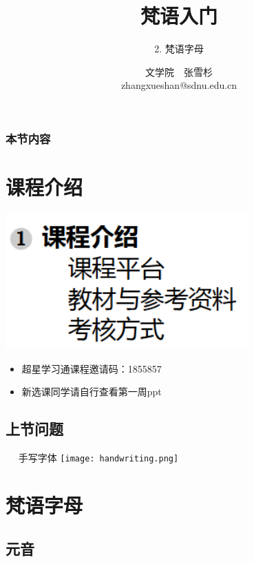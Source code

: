 \documentclass[17pt]{beamer}
\title{{梵语入门}}
\subtitle{2. 梵语字母}
\author[张雪杉]{文学院~~张雪杉 \\ zhangxueshan@sdnu.edu.cn}
\date{}
\begin{document}
	


\begin{frame}
  \titlepage
\end{frame}

\begin{frame}
  \frametitle{本节内容}
  \tableofcontents
\end{frame}

\section{课程介绍}
\begin{frame}{\insertsection }  
  \includegraphics[width=0.7\textwidth]{Course_intro.png} %
  \begin{itemize}
    \item
      超星学习通课程邀请码：1855857
    \item
      新选课同学请自行查看第一周ppt
  \end{itemize}
\end{frame}

\subsection{上节问题}
\begin{frame}{\insertsubsection ~~ 手写字体}  
  \centering
  \texttt{[image: handwriting.png]} %
\end{frame}

\section{梵语字母}
\begin{frame}{\insertsection }
    \tableofcontents[currentsection]
\end{frame}

\subsection{元音}
\end{document}
